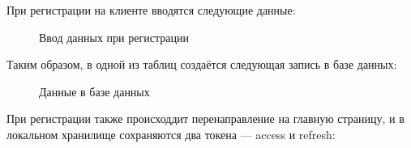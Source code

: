 \documentclass[diploma]{SCWorks}
\begin{document}
При регистрации на клиенте вводятся следующие данные:
\begin{figure}[H]
	\caption{Ввод данных при регистрации}
	\label{pic:reg-frontend}
\end{figure}

Таким образом, в одной из таблиц создаётся следующая запись в базе данных:
\begin{figure}[H]
	\caption{Данные в базе данных}
	\label{pic:reg-backend}
\end{figure}

При регистрации также происходдит перенаправление на главную страницу, и в 
локальном хранилище сохраняются два токена — access и refresh:
\end{document}
